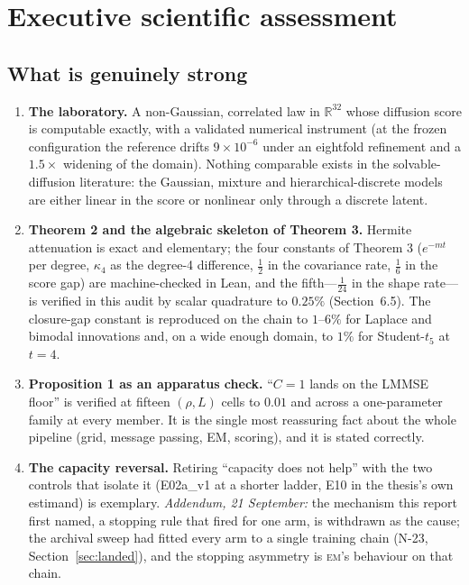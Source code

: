 \documentclass[11pt,a4paper]{article}
\newcommand{\hi}[1]{\textbf{#1}}
\newcommand{\R}{\mathbb{R}}
\theoremstyle{definition}
\theoremstyle{remark}
\begin{document}
\tableofcontents

\section{Executive scientific assessment}
\label{sec:exec}

\subsection{What is genuinely strong}

\begin{enumerate}
\item \hi{The laboratory.} A non-Gaussian, correlated law in $\R^{32}$ whose diffusion score is computable exactly, with a validated numerical instrument (at the frozen configuration the reference drifts $9\times10^{-6}$ under an eightfold refinement and a $1.5\times$ widening of the domain). Nothing comparable exists in the solvable-diffusion literature: the Gaussian, mixture and hierarchical-discrete models are either linear in the score or nonlinear only through a discrete latent.
\item \hi{Theorem 2 and the algebraic skeleton of Theorem 3.} Hermite attenuation is exact and elementary; the four constants of Theorem 3 ($e^{-mt}$ per degree, $\kappa_4$ as the degree-4 difference, $\tfrac12$ in the covariance rate, $\tfrac16$ in the score gap) are machine-checked in Lean, and the fifth---$\tfrac1{24}$ in the shape rate---is verified in this audit by scalar quadrature to $0.25\%$ (Section~6.5). The closure-gap constant is reproduced on the chain to $1$--$6\%$ for Laplace and bimodal innovations and, on a wide enough domain, to $1\%$ for Student-$t_5$ at $t=4$.
\item \hi{Proposition 1 as an apparatus check.} ``$C=1$ lands on the LMMSE floor'' is verified at fifteen $(\rho, L)$ cells to $0.01$ and across a one-parameter family at every member. It is the single most reassuring fact about the whole pipeline (grid, message passing, EM, scoring), and it is stated correctly.
\item \hi{The capacity reversal.} Retiring ``capacity does not help'' with the two controls that isolate it (E02a\_v1 at a shorter ladder, E10 in the thesis's own estimand) is exemplary. \emph{Addendum, 21 September:} the mechanism this report first named, a stopping rule that fired for one arm, is withdrawn as the cause; the archival sweep had fitted every arm to a single training chain (N-23, Section~\ref{sec:landed}), and the stopping asymmetry is \textsc{em}'s behaviour on that chain.

\end{enumerate}
\end{document}

